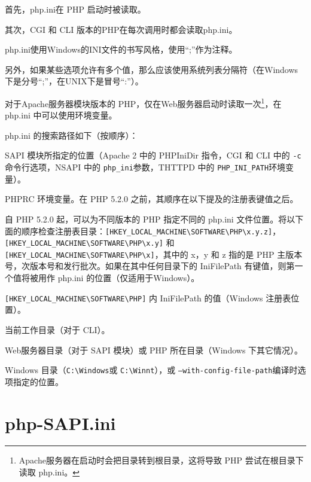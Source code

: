 \begin{compactitem}
\item 首先，php.ini在 PHP 启动时被读取。
\item 其次，CGI 和 CLI 版本的PHP在每次调用时都会读取php.ini。
\end{compactitem}

php.ini使用Windows的INI文件的书写风格，使用“;”作为注释。

另外，如果某些选项允许有多个值，那么应该使用系统列表分隔符（在Windows下是分号“;”，在UNIX下是冒号“:”）。

对于Apache服务器模块版本的 PHP，仅在Web服务器启动时读取一次\footnote{Apache服务器在启动时会把目录转到根目录，这将导致 PHP 尝试在根目录下读取 php.ini。}，在 php.ini 中可以使用环境变量。



php.ini 的搜索路径如下（按顺序）：

\begin{compactitem}
\item SAPI 模块所指定的位置（Apache 2 中的 PHPIniDir 指令，CGI 和 CLI 中的 \texttt{-c} 命令行选项，NSAPI 中的 \texttt{php\_ini}参数，THTTPD 中的 \texttt{PHP\_INI\_PATH}环境变量）。
\item PHPRC 环境变量。在 PHP 5.2.0 之前，其顺序在以下提及的注册表键值之后。
\item 自 PHP 5.2.0 起，可以为不同版本的 PHP 指定不同的 php.ini 文件位置。将以下面的顺序检查注册表目录：\texttt{[HKEY\_LOCAL\_MACHINE{\textbackslash}SOFTWARE{\textbackslash}PHP{\textbackslash}x.y.z]}，\texttt{[HKEY\_LOCAL\_MACHINE{\textbackslash}SOFTWARE{\textbackslash}PHP{\textbackslash}x.y]} 和 \texttt{[HKEY\_LOCAL\_MACHINE{\textbackslash}SOFTWARE{\textbackslash}PHP{\textbackslash}x]}，其中的 x，y 和 z 指的是 PHP 主版本号，次版本号和发行批次。如果在其中任何目录下的 IniFilePath 有键值，则第一个值将被用作 php.ini 的位置（仅适用于Windows）。
\item \texttt{[HKEY\_LOCAL\_MACHINE{\textbackslash}SOFTWARE{\textbackslash}PHP]} 内 IniFilePath 的值（Windows 注册表位置）。
\item 当前工作目录（对于 CLI）。
\item Web服务器目录（对于 SAPI 模块）或 PHP 所在目录（Windows 下其它情况）。
\item Windows 目录（\texttt{C:{\textbackslash}Windows}或 \texttt{C:{\textbackslash}Winnt}），或 \texttt{--with-config-file-path}编译时选项指定的位置。
\end{compactitem}

\section{php-SAPI.ini}


